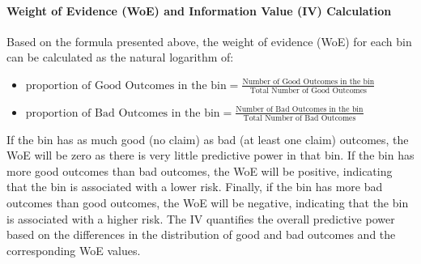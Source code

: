\documentclass[
  english,
  11pt,
]{article}
\providecommand{\tightlist}{%
  \setlength{\itemsep}{0pt}\setlength{\parskip}{0pt}}
\begin{document}
\paragraph{Weight of Evidence (WoE) and Information Value (IV)
Calculation}\label{weight-of-evidence-woe-and-information-value-iv-calculation}

Based on the formula presented above, the weight of evidence (WoE) for
each bin can be calculated as the natural logarithm of:

\begin{itemize}
\tightlist
\item
  \(\text{proportion of Good Outcomes in the bin} = \frac{\text{Number of Good Outcomes in the bin}}{\text{Total Number of Good Outcomes}}\)
\item
  \(\text{proportion of Bad Outcomes in the bin} = \frac{\text{Number of Bad Outcomes in the bin}}{\text{Total Number of Bad Outcomes}}\)
\end{itemize}

If the bin has as much good (no claim) as bad (at least one claim)
outcomes, the WoE will be zero as there is very little predictive power
in that bin. If the bin has more good outcomes than bad outcomes, the
WoE will be positive, indicating that the bin is associated with a lower
risk. Finally, if the bin has more bad outcomes than good outcomes, the
WoE will be negative, indicating that the bin is associated with a
higher risk. The IV quantifies the overall predictive power based on the
differences in the distribution of good and bad outcomes and the
corresponding WoE values.
\end{document}
